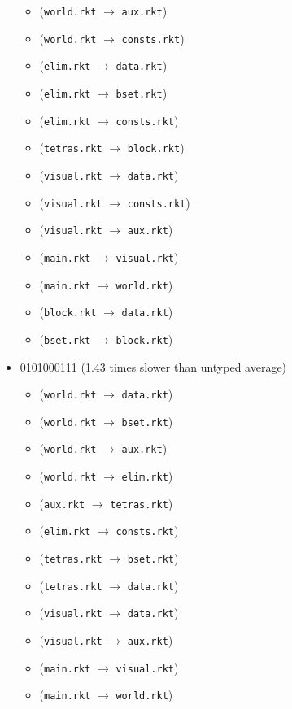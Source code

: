 \documentclass{article}
\newcommand{\mono}[1]{\texttt{#1}}
\begin{document}
\begin{itemize}
\begin{itemize}
  \item (\mono{world.rkt} $\rightarrow$ \mono{aux.rkt})
  \item (\mono{world.rkt} $\rightarrow$ \mono{consts.rkt})
  \item (\mono{elim.rkt} $\rightarrow$ \mono{data.rkt})
  \item (\mono{elim.rkt} $\rightarrow$ \mono{bset.rkt})
  \item (\mono{elim.rkt} $\rightarrow$ \mono{consts.rkt})
  \item (\mono{tetras.rkt} $\rightarrow$ \mono{block.rkt})
  \item (\mono{visual.rkt} $\rightarrow$ \mono{data.rkt})
  \item (\mono{visual.rkt} $\rightarrow$ \mono{consts.rkt})
  \item (\mono{visual.rkt} $\rightarrow$ \mono{aux.rkt})
  \item (\mono{main.rkt} $\rightarrow$ \mono{visual.rkt})
  \item (\mono{main.rkt} $\rightarrow$ \mono{world.rkt})
  \item (\mono{block.rkt} $\rightarrow$ \mono{data.rkt})
  \item (\mono{bset.rkt} $\rightarrow$ \mono{block.rkt})
  \end{itemize}
\item 0101000111 (1.43 times slower than untyped average)
  \begin{itemize}
  \item (\mono{world.rkt} $\rightarrow$ \mono{data.rkt})
  \item (\mono{world.rkt} $\rightarrow$ \mono{bset.rkt})
  \item (\mono{world.rkt} $\rightarrow$ \mono{aux.rkt})
  \item (\mono{world.rkt} $\rightarrow$ \mono{elim.rkt})
  \item (\mono{aux.rkt} $\rightarrow$ \mono{tetras.rkt})
  \item (\mono{elim.rkt} $\rightarrow$ \mono{consts.rkt})
  \item (\mono{tetras.rkt} $\rightarrow$ \mono{bset.rkt})
  \item (\mono{tetras.rkt} $\rightarrow$ \mono{data.rkt})
  \item (\mono{visual.rkt} $\rightarrow$ \mono{data.rkt})
  \item (\mono{visual.rkt} $\rightarrow$ \mono{aux.rkt})
  \item (\mono{main.rkt} $\rightarrow$ \mono{visual.rkt})
  \item (\mono{main.rkt} $\rightarrow$ \mono{world.rkt})

\end{itemize}
\end{itemize}
\end{document}
